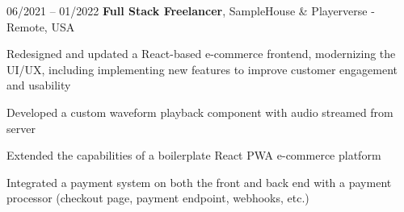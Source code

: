 

\begin{twocolentry}{
    06/2021 – 01/2022
}
\fontsize{11 pt}{11 pt}\textbf{Full Stack Freelancer}, SampleHouse \& Playerverse - Remote, USA\end{twocolentry}

\vspace{0.10 cm}
\begin{onecolentry}
   \begin{highlights}
       \item Redesigned and updated a React-based e-commerce frontend, modernizing the UI/UX, including implementing new features to improve customer engagement and usability
       \item Developed a custom waveform playback component with audio streamed from server
       \item Extended the capabilities of a boilerplate React PWA e-commerce platform
       \item Integrated a payment system on both the front and back end with a payment processor (checkout page, payment endpoint, webhooks, etc.)
   \end{highlights}
\end{onecolentry}